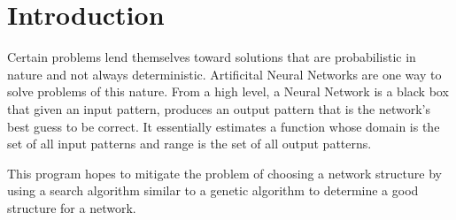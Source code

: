 \section{Introduction}
Certain problems lend themselves toward solutions that are probabilistic in nature and not always deterministic. 
Artificital Neural Networks are one way to solve problems of this nature. From a high level, a Neural Network is a black
box that given an input pattern, produces an output pattern that is the network's best guess to be correct. 
It essentially estimates a function whose domain is the set of all input patterns and range is the set of all output patterns.

This program hopes to mitigate the problem of choosing a network structure by using a search algorithm similar to a genetic algorithm to determine a good structure for a network. 
